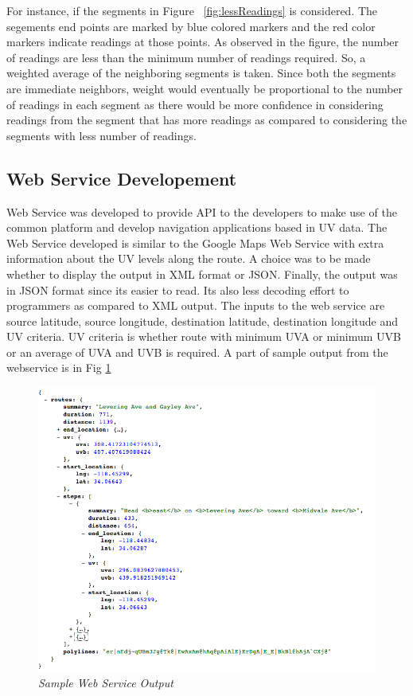 \documentclass[12pt,fullpage,doublespace]{article}
\begin{document}
For instance, if the segments in Figure ~\ref{fig:lessReadings} is considered. The segements end points are marked by blue colored markers and the red color markers indicate readings at those points. As observed in the figure, the number of readings are less than the minimum number of readings required. So, a weighted average of the neighboring segments is taken. Since both the segments are immediate neighbors, weight would eventually be proportional to the number of readings in each segment as there would be more confidence in considering readings from the segment that has more readings as compared to considering the segments with less number of readings. 

\newpage
\subsection{Web Service Developement}
Web Service was developed to provide API to the developers to make use of the common platform and develop navigation applications based in UV data. The Web Service developed is similar to the Google Maps Web Service \cite{googleWebService} with extra information about the UV levels along the route. A choice was to be made whether to display the output in XML format or JSON. Finally, the output was in JSON format since its easier to read. Its also less decoding effort to programmers as compared to XML output. The inputs to the web service are source latitude, source longitude, destination latitude, destination longitude and UV criteria. UV criteria is whether route with minimum UVA or minimum UVB or an average of UVA and UVB is required. A part of sample output from the webservice is in Fig 
\ref{fig:webServiceOutput}
\begin{figure}[hb]
\begin{center}
\includegraphics[scale=0.4]{webServiceOutput.png}
\caption{\small \sl Sample Web Service Output}
\label{fig:webServiceOutput}
\end{center}
\end{figure}
\end{document}
